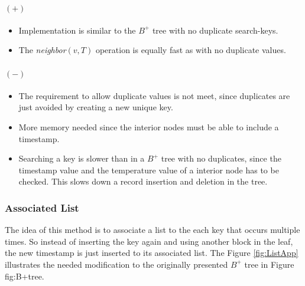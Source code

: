 \documentclass[abstracton,12pt]{scrreprt}
\begin{document}
\paragraph{$(+)$}
\begin{itemize}  
	\item Implementation is similar to the $B^+$ tree with no duplicate search-keys. 
	\item The \emph{neighbor}$(v,T)$ operation is equally fast as with no duplicate values. 
\end{itemize}
\paragraph{$(-)$}
\begin{itemize}  
	\item The requirement to allow duplicate values is not meet, since duplicates are just avoided by creating a new unique key. 
	\item More memory needed since the interior nodes must be able to include a timestamp. 
	\item Searching a key is slower than in a $B^+$ tree with no duplicates, since the timestamp value and the temperature value of a interior node has to be checked. This slows down a record insertion and deletion in the tree. 
\end{itemize}

\subsubsection{Associated List}
\label{Associated List}
The idea of this method is to associate a list to the each key that occurs multiple times. So instead of inserting the key again and using another block in the leaf, the new timestamp is just inserted to its associated list. The Figure \ref{fig:ListApp} illustrates the needed modification to the originally presented $B^+$ tree in Figure {fig:B+tree}.
\end{document}
